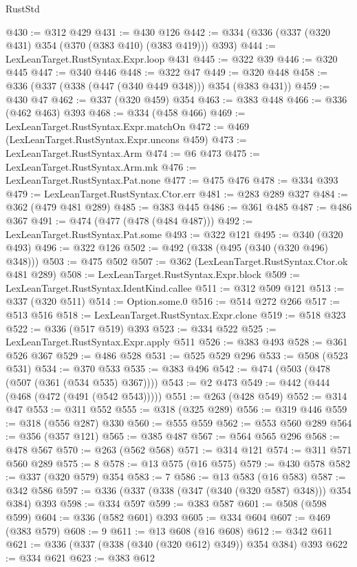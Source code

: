 \begin{lexlean}{RustStd}
\begin{coremodule}
@430 := @312 @429
@431 := @430 @126
@442 := @334 (@336 (@337 (@320 @431) @354 (@370 (@383 @410) (@383 @419))) @393)
@444 := LexLeanTarget.RustSyntax.Expr.loop @431
@445 := @322 @39
@446 := @320 @445
@447 := @340 @446
@448 := @322 @47
@449 := @320 @448
@458 := @336 (@337 (@338 (@447 (@340 @449 @348))) @354 (@383 @431))
@459 := @430 @47
@462 := @337 (@320 @459) @354
@463 := @383 @448
@466 := @336 (@462 @463) @393
@468 := @334 (@458 @466)
@469 := LexLeanTarget.RustSyntax.Expr.matchOn
@472 := @469 (LexLeanTarget.RustSyntax.Expr.uncons @459)
@473 := LexLeanTarget.RustSyntax.Arm
@474 := @6 @473
@475 := LexLeanTarget.RustSyntax.Arm.mk
@476 := LexLeanTarget.RustSyntax.Pat.none
@477 := @475 @476
@478 := @334 @393
@479 := LexLeanTarget.RustSyntax.Ctor.err
@481 := @283 @289 @327
@484 := @362 (@479 @481 @289)
@485 := @383 @445
@486 := @361 @485
@487 := @486 @367
@491 := @474 (@477 (@478 (@484 @487)))
@492 := LexLeanTarget.RustSyntax.Pat.some
@493 := @322 @121
@495 := @340 (@320 @493)
@496 := @322 @126
@502 := @492 (@338 (@495 (@340 (@320 @496) @348)))
@503 := @475 @502
@507 := @362 (LexLeanTarget.RustSyntax.Ctor.ok @481 @289)
@508 := LexLeanTarget.RustSyntax.Expr.block
@509 := LexLeanTarget.RustSyntax.IdentKind.callee
@511 := @312 @509 @121
@513 := @337 (@320 @511)
@514 := Option.some.{0}
@516 := @514 @272 @266
@517 := @513 @516
@518 := LexLeanTarget.RustSyntax.Expr.clone
@519 := @518 @323
@522 := @336 (@517 @519) @393
@523 := @334 @522
@525 := LexLeanTarget.RustSyntax.Expr.apply @511
@526 := @383 @493
@528 := @361 @526 @367
@529 := @486 @528
@531 := @525 @529 @296
@533 := @508 (@523 @531)
@534 := @370 @533
@535 := @383 @496
@542 := @474 (@503 (@478 (@507 (@361 (@534 @535) @367))))
@543 := @2 @473
@549 := @442 (@444 (@468 (@472 (@491 (@542 @543)))))
@551 := @263 (@428 @549)
@552 := @314 @47
@553 := @311 @552
@555 := @318 (@325 @289)
@556 := @319 @446
@559 := @318 (@556 @287) @330
@560 := @555 @559
@562 := @553 @560 @289
@564 := @356 (@357 @121)
@565 := @385 @487
@567 := @564 @565 @296
@568 := @478 @567
@570 := @263 (@562 @568)
@571 := @314 @121
@574 := @311 @571 @560 @289
@575 := 8
@578 := @13 @575 (@16 @575)
@579 := @430 @578
@582 := @337 (@320 @579) @354
@583 := 7
@586 := @13 @583 (@16 @583)
@587 := @342 @586
@597 := @336 (@337 (@338 (@347 (@340 (@320 @587) @348))) @354 @384) @393
@598 := @334 @597
@599 := @383 @587
@601 := @508 (@598 @599)
@604 := @336 (@582 @601) @393
@605 := @334 @604
@607 := @469 (@383 @579)
@608 := 9
@611 := @13 @608 (@16 @608)
@612 := @342 @611
@621 := @336 (@337 (@338 (@340 (@320 @612) @349)) @354 @384) @393
@622 := @334 @621
@623 := @383 @612

\end{coremodule}
\end{lexlean}
